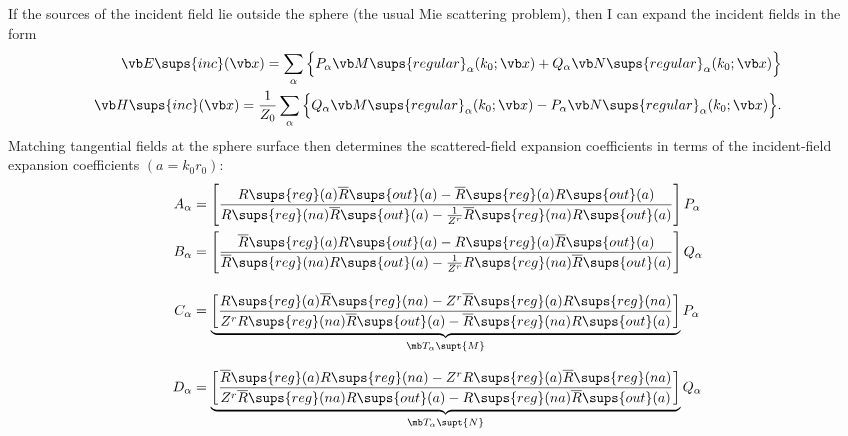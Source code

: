 \documentclass[letterpaper]{article}
\newcommand{\RBar}{\overline{R}}
\begin{document}
If the sources of the incident field lie outside the sphere
(the usual Mie scattering problem),
then I can expand the incident fields in the form
\begin{subequations}
\begin{align}
  \vb E\sups{inc}(\vb x) =
   \sum_{\alpha}
    \Big\{
        P_\alpha \vb M\sups{regular}_\alpha(k_0; \vb x)
       +Q_\alpha \vb N\sups{regular}_\alpha(k_0; \vb x)
    \Big\}
\\
  \vb H\sups{inc}(\vb x) =
   \frac{1}{Z_0}
   \sum_{\alpha}
    \Big\{
        Q_\alpha \vb M\sups{regular}_\alpha(k_0; \vb x)
       -P_\alpha \vb N\sups{regular}_\alpha(k_0; \vb x)
    \Big\}.
\end{align}
\label{EHIncOutsideExpansion} %
\end{subequations}
Matching tangential fields at the sphere surface then 
determines
the scattered-field expansion coefficients in terms of the 
incident-field expansion coefficients $(a=k_0 r_0)$:
\begin{subequations}
\begin{align}
 A_\alpha 
 &= \left[\frac{  R\sups{reg}(a) \RBar\sups{out}(a)
                -\RBar\sups{reg}(a) R\sups{out}(a)
         }
         {
            R\sups{reg}(n a) \RBar\sups{out}(a) 
           -\frac{1}{Z^r} \RBar\sups{reg}(n a) R\sups{out}(a)
          }
    \right]P_\alpha
\\
 B_\alpha 
 &= \left[\frac{  \RBar\sups{reg}(a) R\sups{out}(a) 
                -R\sups{reg}(a) \RBar\sups{out}(a)
         }
         {
            \RBar\sups{reg}(n a) R\sups{out}(a) 
           -\frac{1}{Z^r} R\sups{reg}(n a) \RBar\sups{out}(a)
          }
    \right]Q_\alpha
\\[10pt]
 C_\alpha 
 &=\underbrace{ 
    \left[\frac{      R\sups{reg}(a) \RBar\sups{reg}(n a)
                 -Z^r \RBar\sups{reg}(a) R\sups{reg}(n a)
               }
         {
            Z^r R\sups{reg}(n a) \RBar\sups{out}(a) 
           -    \RBar\sups{reg}(n a) R\sups{out}(a)
          }
    \right] }_{\mb T_{\alpha}\supt{M}}
          P_\alpha
\\[8pt]
 D_\alpha 
 &= \underbrace{
    \left[\frac{     \RBar\sups{reg}(a) R\sups{reg}(na) 
                 -Z^r R\sups{reg}(a) \RBar\sups{reg}(na)
         }
         {
            Z^r \RBar\sups{reg}(n a) R\sups{out}(a) 
           - R\sups{reg}(n a) \RBar\sups{out}(a)
          }
    \right]
              }_{\mb T_{\alpha}\supt{N}}
          Q_\alpha
\end{align}
\label{ABCDOutside}%
\end{subequations}
\end{document}
